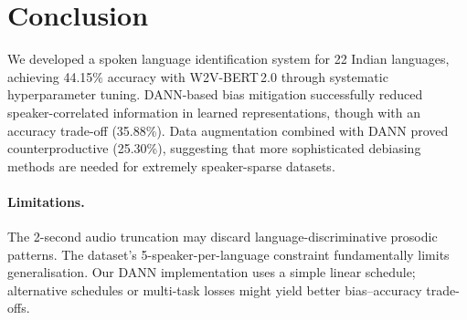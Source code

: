 \documentclass[11pt]{article}
\begin{document}
\section{Conclusion}
\label{sec:conclusion}

We developed a spoken language identification system for 22 Indian languages, achieving 44.15\% accuracy with \textsc{W2V-BERT\,2.0} through systematic hyperparameter tuning.
DANN-based bias mitigation successfully reduced speaker-correlated information in learned representations, though with an accuracy trade-off (35.88\%).
Data augmentation combined with DANN proved counterproductive (25.30\%), suggesting that more sophisticated debiasing methods are needed for extremely speaker-sparse datasets.

\paragraph{Limitations.}
The 2-second audio truncation may discard language-discriminative prosodic patterns.
The dataset's 5-speaker-per-language constraint fundamentally limits generalisation.
Our DANN implementation uses a simple linear schedule; alternative schedules or multi-task losses might yield better bias–accuracy trade-offs.



\end{document}
